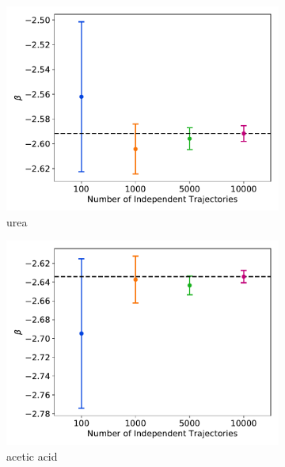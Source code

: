 \documentclass{article}
\begin{document}
  \begin{figure}
  \centering
  \begin{subfigure}{0.45\textwidth}
  \includegraphics[width=\textwidth]{flux_curves_betasensitivity_URE.pdf}
  \caption{urea}\label{fig:betasensitivity_URE}
  \end{subfigure}
  \begin{subfigure}{0.45\textwidth}
  \includegraphics[width=\textwidth]{flux_curves_betasensitivity_ACH.pdf}
  \caption{acetic acid}\label{fig:betasensitivity_ACH}
  \end{subfigure}
  \begin{subfigure}{0.45\textwidth}

\end{subfigure}
\end{figure}
\end{document}
